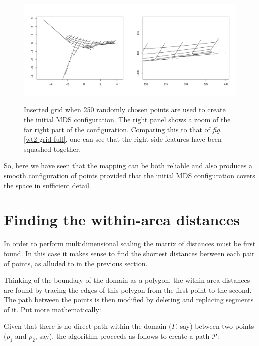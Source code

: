 \documentclass[a4paper,10pt]{article}
\newcommand{\fig}[1]{\emph{fig.} \ref{#1}}
\begin{document}
\begin{figure}
\centering
\includegraphics[width=5in]{figs/wt2-grid-samp.pdf} \\
\caption{Inserted grid when 250 randomly chosen points are used to create the initial MDS configuration. The right panel shows a zoom of the far right part of the configuration. Comparing this to that of \fig{wt2-grid-full}, one can see that the right side features have been squashed together.}
\label{wt2-grid-samp}
\end{figure}

So, here we have seen that the mapping can be both reliable and also produces a smooth configuration of points provided that the initial MDS configuration covers the space in sufficient detail.


\section{Finding the within-area distances}

In order to perform multidimensional scaling the matrix of distances must be first found. In this case it makes sense to find the shortest distances between each pair of points, as alluded to in the previous section.

Thinking of the boundary of the domain as a polygon, the within-area distances are found by tracing the edges of this polygon from the first point to the second. The path between the points is then modified by deleting and replacing segments of it. Put more mathematically:

Given that there is no direct path within the domain ($\Gamma$, say) between two points ($p_1$ and $p_2$, say), the algorithm proceeds as follows to create a path $\mathcal{P}$:
\end{document}
